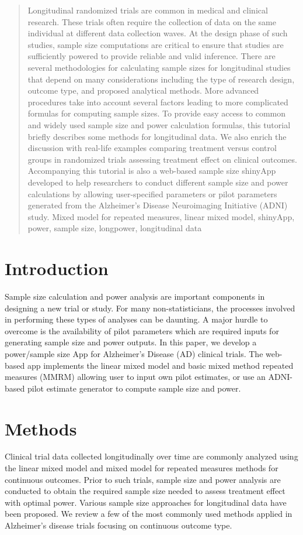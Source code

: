 \documentclass[oupdraft]{bio}
\begin{document}
	\begin{abstract}
		{Longitudinal randomized trials are common in medical and clinical research. These trials often require the collection of data on the same individual at different data collection waves. At the design phase of such studies, sample size computations are critical to ensure that studies are sufficiently powered to provide reliable and valid inference. There are several methodologies for calculating sample sizes for longitudinal studies that depend on many considerations including the type of research design, outcome type, and proposed analytical methods. More advanced procedures take into account several factors leading to more complicated formulas for computing sample sizes. To provide easy access to common and widely used sample size and power calculation formulas, this tutorial briefly describes some methods for longitudinal data.  We also enrich the discussion with real-life examples comparing treatment versus control groups in randomized trials assessing treatment effect on clinical outcomes. Accompanying this tutorial is also a web-based sample size shinyApp developed to help researchers to conduct different sample size and power calculations by allowing user-specified parameters or pilot parameters generated from the Alzheimer’s Disease Neuroimaging Initiative (ADNI) study.}
		{Mixed model for repeated measures, linear mixed model, shinyApp, power, sample size, longpower, longitudinal data}
	\end{abstract}
	
	
\section{Introduction}
\label{sec1}
Sample size calculation and power analysis are important components in designing a new trial or study. For many non-statisticians, the processes involved in performing these types of analyses can be daunting. A major hurdle to overcome is the availability of pilot parameters which are required inputs for generating sample size and power outputs. In this paper, we develop a power/sample size App for Alzheimer's Disease (AD) clinical trials. The web-based app  implements the linear mixed model and basic mixed method repeated measures (MMRM) allowing user to input own pilot estimates, or use an ADNI-based pilot estimate generator to compute sample size and power. 



\section{Methods}
\label{sec2}
Clinical trial data collected longitudinally over time are commonly analyzed using the linear mixed model and mixed model for repeated measures methods for continuous outcomes. Prior to such trials, sample size and power analysis are conducted to obtain the required sample size needed to assess treatment effect with optimal power. Various sample size approaches for longitudinal data have been proposed. We review a few of the most commonly used methods applied in Alzheimer's disease trials focusing on continuous outcome type.
\end{document}
